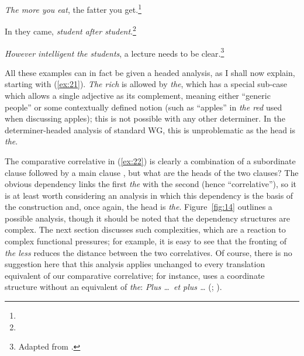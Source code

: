 \documentclass[output=paper,biblatex,babelshorthands,newtxmath,draftmode,colorlinks,citecolor=brown]{langscibook}
\begin{document}
\ex \label{ex:22} \emph{The more you eat}, the fatter you get.\footnote{}

\ex \label{ex:23} In they came, \emph{student after student}.\footnote{}

\ex \label{ex:24} \emph{However intelligent the students}, a lecture needs to be
clear.\footnote{Adapted from .}
\zl

\noindent
All these examples can in fact be given a headed analysis, as I shall now explain, starting with
(\ref{ex:21}). \emph{The rich} is allowed by \emph{the}, which has a special sub-case which allows a
single adjective as its complement, meaning either ``generic people'' or some contextually defined
notion (such as ``apples'' in \emph{the red} used when discussing apples); this is not possible with
any other determiner. In the determiner-headed analysis of standard WG, this is unproblematic as the
head is \emph{the}.

The comparative correlative in (\ref{ex:22}) is clearly a combination of a subordinate clause
followed by a main clause \citep{CJ99a-u}, but what are the heads of the two clauses? The obvious
dependency links the first \emph{the} with the second (hence ``correlative''), so it is at least
worth considering an analysis in which this dependency is the basis of the construction and, once
again, the head is \emph{the}. Figure~\ref{fig:14} outlines a possible analysis, though it should be
noted that the dependency structures are complex. The next section discusses such complexities,
which are a reaction to complex functional pressures; for example, it is easy to see that the
fronting of \emph{the less} reduces the distance between the two correlatives. Of course, there is
no suggestion here that this analysis applies unchanged to every translation equivalent of our
comparative correlative; for instance,  uses a coordinate structure without an
equivalent of \emph{the}: \emph{Plus \dots\ et plus \dots} (\citealt{Abeille:Borsley:08}; ).
\end{document}
